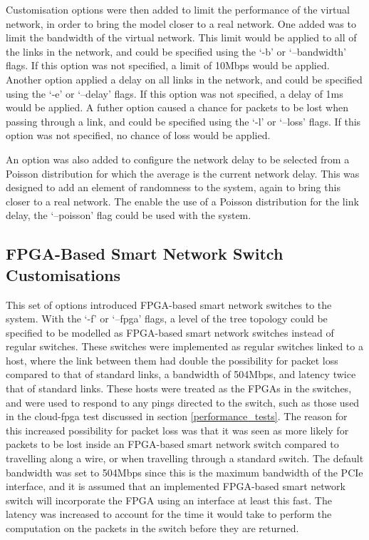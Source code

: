 {%
Customisation options were then added to limit the performance of the virtual network, in order to bring the model closer to a real network.
One added was to limit the bandwidth of the virtual network.
This limit would be applied to all of the links in the network, and could be specified using the `-b' or `--bandwidth' flags.
If this option was not specified, a limit of 10Mbps would be applied.
Another option applied a delay on all links in the network, and could be specified using the `-e' or `--delay' flags.
If this option was not specified, a delay of 1ms would be applied.
A futher option caused a chance for packets to be lost when passing through a link, and could be specified using the `-l' or `--loss' flags.
If this option was not specified, no chance of loss would be applied.

An option was also added to configure the network delay to be selected from a Poisson distribution for which the average is the current network delay.
This was designed to add an element of randomness to the system, again to bring this closer to a real network.
The enable the use of a Poisson distribution for the link delay, the `--poisson' flag could be used with the system.

\subsection{FPGA-Based Smart Network Switch Customisations}
\label{FPGA_Based_Smart_Network_Switch_Customisations}

This set of options introduced FPGA-based smart network switches to the system.
With the `-f' or `--fpga' flags, a level of the tree topology could be specified to be modelled as FPGA-based smart network switches instead of regular switches.
These switches were implemented as regular switches linked to a host, where the link between them had double the possibility for packet loss compared to that of standard links, a bandwidth of 504Mbps, and latency twice that of standard links.
These hosts were treated as the FPGAs in the switches, and were used to respond to any pings directed to the switch, such as those used in the cloud-fpga test discussed in section \ref{performance_tests}.
The reason for this increased possibility for packet loss was that it was seen as more likely for packets to be lost inside an FPGA-based smart network switch compared to travelling along a wire, or when travelling through a standard switch.
The default bandwidth was set to 504Mbps since this is the maximum bandwidth of the PCIe interface, and it is assumed that an implemented FPGA-based smart network switch will incorporate the FPGA using an interface at least this fast.
The latency was increased to account for the time it would take to perform the computation on the packets in the switch before they are returned.

}
